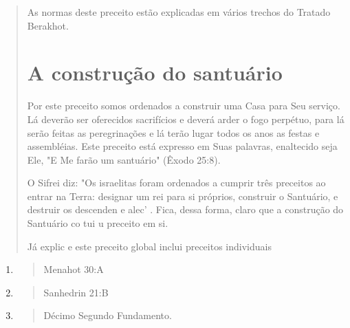 \begin{quote}
As normas deste preceito estão explicadas em vários trechos do Tra­tado
Berakhot.

\section{A construção do santuário}

Por este preceito somos ordenados a construir uma Casa para Seu serviço.
Lá deverão ser oferecidos sacrifícios e deverá arder o fogo perpétuo,
para lá serão feitas as peregrinações e lá terão lugar todos os anos as
festas e assembléias. Este preceito está expresso em Suas palavras,
enaltecido seja Ele, "E Me farão um santuário" (Êxodo 25:8).

O Sifrei diz: "Os israelitas foram ordenados a cumprir três preceitos ao
entrar na Terra: designar um rei para si próprios, construir o
Santuário, e destruir os descenden e alec' . Fica, dessa forma, claro
que a constru­ção do Santuário co tui u preceito em si.

Já explic e este preceito global inclui preceitos individuais
\end{quote}

\begin{enumerate}
\def\labelenumi{\arabic{enumi}.}
\setcounter{enumi}{43}
\item
 \begin{quote}
 Menahot 30:A
 \end{quote}
\item
 \begin{quote}
 Sanhedrin 21:B
 \end{quote}
\item
 \begin{quote}
 Décimo Segundo Fundamento.
 \end{quote}
\end{enumerate}

